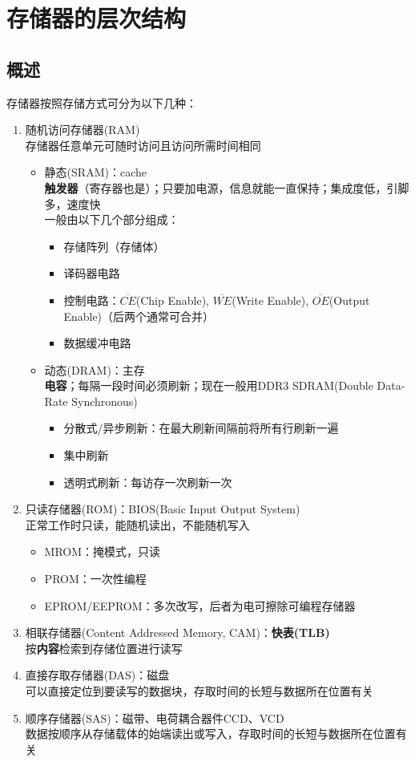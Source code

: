 
\section{存储器的层次结构}
\subsection{概述}
存储器按照存储方式可分为以下几种：
\begin{enumerate}
	\item 随机访问存储器(RAM)\\
	存储器任意单元可随时访问且访问所需时间相同
	\begin{itemize}
		\item 静态(SRAM)：cache\\
		\textbf{触发器}（寄存器也是）；只要加电源，信息就能一直保持；集成度低，引脚多，速度快\\
		一般由以下几个部分组成：
		\begin{itemize}
			\item 存储阵列（存储体）
			\item 译码器电路
			\item 控制电路：$\overline{CE}$(Chip Enable), $\overline{WE}$(Write Enable), $\overline{OE}$(Output Enable)（后两个通常可合并）
			\item 数据缓冲电路
		\end{itemize}
		\item 动态(DRAM)：主存\\
		\textbf{电容}；每隔一段时间必须刷新；现在一般用DDR3 SDRAM(Double Data-Rate Synchronous)\\
		\begin{itemize}
			\item 分散式/异步刷新：在最大刷新间隔前将所有行刷新一遍
			\item 集中刷新
			\item 透明式刷新：每访存一次刷新一次
		\end{itemize}
	\end{itemize}
	\item 只读存储器(ROM)：BIOS(Basic Input Output System)\\
	正常工作时只读，能随机读出，不能随机写入
	\begin{itemize}
		\item MROM：掩模式，只读
		\item PROM：一次性编程
		\item EPROM/EEPROM：多次改写，后者为电可擦除可编程存储器
	\end{itemize}
	\item 相联存储器(Content Addressed Memory, CAM)：\textbf{快表(TLB)}\\
	按\textbf{内容}检索到存储位置进行读写
	\item 直接存取存储器(DAS)：磁盘\\
	可以直接定位到要读写的数据块，存取时间的长短与数据所在位置有关
	\item 顺序存储器(SAS)：磁带、电荷耦合器件CCD、VCD\\
	数据按顺序从存储载体的始端读出或写入，存取时间的长短与数据所在位置有关
\end{enumerate}
